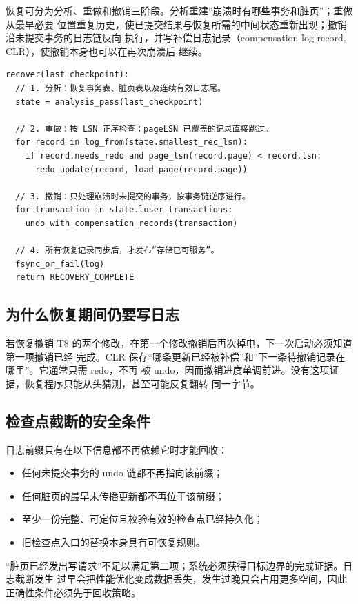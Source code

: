 恢复可分为分析、重做和撤销三阶段。分析重建“崩溃时有哪些事务和脏页”；重做从最早必要
位置重复历史，使已提交结果与恢复所需的中间状态重新出现；撤销沿未提交事务的日志链反向
执行，并写补偿日志记录（compensation log record, CLR），使撤销本身也可以在再次崩溃后
继续。

\begin{lstlisting}
recover(last_checkpoint):
  // 1. 分析：恢复事务表、脏页表以及连续有效日志尾。
  state = analysis_pass(last_checkpoint)

  // 2. 重做：按 LSN 正序检查；pageLSN 已覆盖的记录直接跳过。
  for record in log_from(state.smallest_rec_lsn):
    if record.needs_redo and page_lsn(record.page) < record.lsn:
      redo_update(record, load_page(record.page))

  // 3. 撤销：只处理崩溃时未提交的事务，按事务链逆序进行。
  for transaction in state.loser_transactions:
    undo_with_compensation_records(transaction)

  // 4. 所有恢复记录同步后，才发布“存储已可服务”。
  fsync_or_fail(log)
  return RECOVERY_COMPLETE
\end{lstlisting}

\subsection{为什么恢复期间仍要写日志}

若恢复撤销 T8 的两个修改，在第一个修改撤销后再次掉电，下一次启动必须知道第一项撤销已经
完成。CLR 保存“哪条更新已经被补偿”和“下一条待撤销记录在哪里”。它通常只需 redo，不再
被 undo，因而撤销进度单调前进。没有这项证据，恢复程序只能从头猜测，甚至可能反复翻转
同一字节。

\subsection{检查点截断的安全条件}

日志前缀只有在以下信息都不再依赖它时才能回收：

\begin{itemize}
\tightlist
\item 任何未提交事务的 undo 链都不再指向该前缀；
\item 任何脏页的最早未传播更新都不再位于该前缀；
\item 至少一份完整、可定位且校验有效的检查点已经持久化；
\item 旧检查点入口的替换本身具有可恢复规则。
\end{itemize}

“脏页已经发出写请求”不足以满足第二项；系统必须获得目标边界的完成证据。日志截断发生
过早会把性能优化变成数据丢失，发生过晚只会占用更多空间，因此正确性条件必须先于回收策略。

